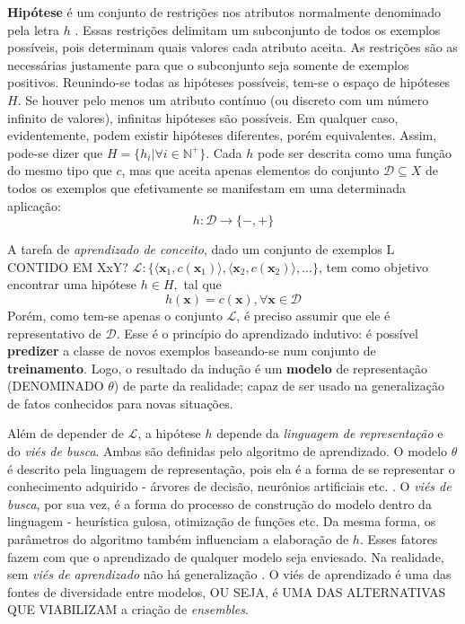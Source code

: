 \textbf{Hipótese} é um conjunto de restrições nos atributos normalmente denominado pela letra $h$ \citep{mitchell1997machine}.
Essas restrições delimitam um subconjunto de todos os exemplos possíveis, pois determinam quais valores cada atributo aceita.
As restrições são as necessárias justamente para que o subconjunto seja somente de exemplos positivos.
Reunindo-se todas as hipóteses possíveis, tem-se o espaço de hipóteses $H$.
Se houver pelo menos um atributo contínuo (ou discreto com um número infinito de valores), infinitas hipóteses são possíveis.
Em qualquer caso, evidentemente, podem existir hipóteses diferentes, porém equivalentes.
Assim, pode-se dizer que $H = \{h_i | \forall i \in \mathbb{N}^+\}$.
Cada $h$ pode ser descrita como uma função do mesmo tipo que $c$, mas que aceita apenas elementos do conjunto $\mathcal{D} \subseteq X$ de todos os exemplos que efetivamente se manifestam em uma determinada aplicação:
\begin{equation}
h: \mathcal{D} \rightarrow \{-,+\}
\end{equation}


A tarefa de \textit{aprendizado de conceito}, dado um conjunto de exemplos L CONTIDO EM XxY? $\mathcal{L}:\{\langle \bm{x}_1, c(\bm{x}_1) \rangle, \langle \bm{x}_2, c(\bm{x}_2) \rangle, ... \}$, tem como objetivo encontrar uma hipótese $h \in H,$ tal que
\begin{equation}
 h(\bm{x}) = c(\bm{x}), \forall \bm{x} \in \mathcal{D}
\end{equation}
Porém, como tem-se apenas o conjunto $\mathcal{L}$, é preciso assumir que ele é representativo de $\mathcal{D}$.
Esse é o princípio do aprendizado indutivo: é possível \textbf{predizer} a classe de novos exemplos baseando-se num conjunto de \textbf{treinamento}.
Logo, o resultado da indução é um \textbf{modelo} de representação (DENOMINADO $\theta$) de parte da realidade; capaz de ser usado na generalização de fatos conhecidos para novas situações.

Além de depender de $\mathcal{L}$, a hipótese $h$ depende da \textit{linguagem de representação} e do \textit{viés de busca}.
Ambas são definidas pelo algoritmo de aprendizado.
O modelo $\theta$ é descrito pela linguagem de representação, pois ela é a forma de se representar o conhecimento adquirido -
árvores de decisão, neurônios artificiais etc. \citep{quinlan1993c4,haykin1994neural}.
O \textit{viés de busca}, por sua vez, é a forma do processo de construção do modelo dentro da linguagem -
heurística gulosa, otimização de funções etc.
Da mesma forma, os parâmetros do algoritmo também influenciam a elaboração de $h$.
Esses fatores fazem com que o aprendizado de qualquer modelo seja enviesado.
Na realidade, sem \textit{viés de aprendizado} não há generalização \citep{mitchell1980need}.
O viés de aprendizado é uma das fontes de diversidade entre modelos, OU SEJA, é UMA DAS ALTERNATIVAS QUE VIABILIZAM a criação de \textit{ensembles}.

